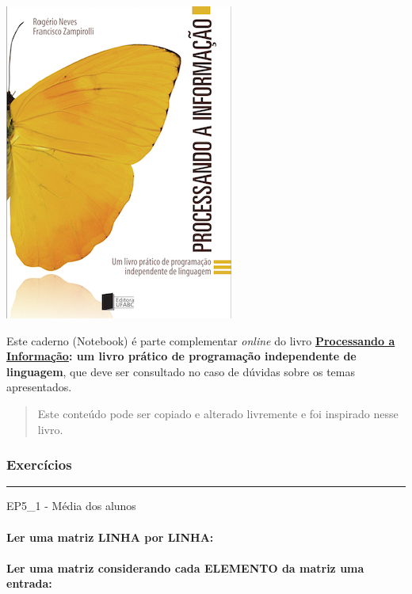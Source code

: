 \documentclass[12pt,a4paper]{article}
\begin{document}
    \includegraphics{"figs/Capa_Processando_Informacao.jpg"}

Este caderno (Notebook) é parte complementar \emph{online} do livro
\textbf{\href{https://editora.ufabc.edu.br/matematica-e-ciencias-da-computacao/58-processando-a-informacao}{Processando
a Informação}: um livro prático de programação independente de
linguagem}, que deve ser consultado no caso de dúvidas sobre os temas
apresentados.

\begin{quote}
Este conteúdo pode ser copiado e alterado livremente e foi inspirado
nesse livro.
\end{quote}

    \hypertarget{exercuxedcios}{%
\subsubsection{Exercícios}\label{exercuxedcios}}

    \begin{center}\rule{0.5\linewidth}{0.5pt}\end{center}

EP5\_1 - Média dos alunos

    \hypertarget{ler-uma-matriz-linha-por-linha}{%
\paragraph{Ler uma matriz LINHA por
LINHA:}\label{ler-uma-matriz-linha-por-linha}}

    \hypertarget{ler-uma-matriz-considerando-cada-elemento-da-matriz-uma-entrada}{%
\paragraph{Ler uma matriz considerando cada ELEMENTO da matriz uma
entrada:}\label{ler-uma-matriz-considerando-cada-elemento-da-matriz-uma-entrada}}


    
    
    
\end{document}
